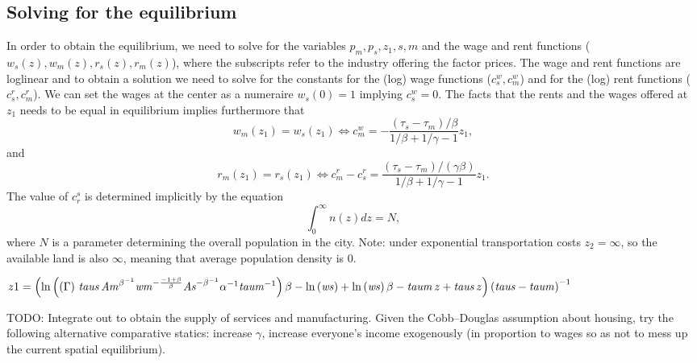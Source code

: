 \documentclass[10pt]{article}
\begin{document}
\subsection{Solving for the equilibrium}
In order to obtain the equilibrium, we need to solve for the variables $p_m,p_s,z_1,s,m$ and the wage and rent functions ($w_s(z),w_m(z),r_s(z),r_m(z)$), where the subscripts refer to the industry offering the factor prices. The wage and rent functions are loglinear and to obtain a solution we need to solve for the constants for the (log) wage functions ($c^w_s,c^w_m$) and for the (log) rent functions ($c^r_s, c^r_m$). We can set the wages at the center as a numeraire $w_s(0)=1$ implying $c^w_s=0$. The facts that the rents and the wages offered at $z_1$ needs to be equal in equilibrium implies furthermore that
\begin{equation*}
w_m(z_1)=w_s(z_1) \Leftrightarrow c^w_m=-\frac{(\tau_s-\tau_m)/\beta}{1/\beta+1/\gamma-1}z_1,
\end{equation*}
and
\begin{equation*}
r_m(z_1)=r_s(z_1) \Leftrightarrow c^r_m-c^r_s=\frac{(\tau_s-\tau_m)/(\gamma\beta)}{1/\beta+1/\gamma-1}{z_1}.
\end{equation*}
The value of $c_r^s$ is determined implicitly by the equation
\begin{equation*}
\int_0^\infty n(z)dz=N,
\end{equation*}
where $N$ is a parameter determining the overall population in the city. Note: under exponential transportation costs $z_2=\infty$, so the available land is also $\infty$, meaning that average population density is 0.

$z1=\left( \ln  \left(  \left( \Gamma  \right) \,{\it taus}\,{{\it Am}}^{{\beta}^{-1}}{{\it wm}}^{-{\frac {-1+\beta}{\beta}}}{{\it As}}^{-{\beta}^{-1}}{\alpha}^{-1}{{\it taum}}^{-1} \right) \beta-\ln  \left( {\it ws} \right) +\ln  \left( {\it ws} \right) \beta-{\it taum}\,z+{\it taus}\,z \right)  \left( {\it taus}-{\it taum} \right) ^{-1}$


TODO: Integrate out to obtain the supply of services and manufacturing. Given the Cobb--Douglas assumption about housing, try the following alternative comparative statics: increase $\gamma$, increase everyone's income exogenously (in proportion to wages so as not to mess up the current spatial equilibrium).
\end{document}
